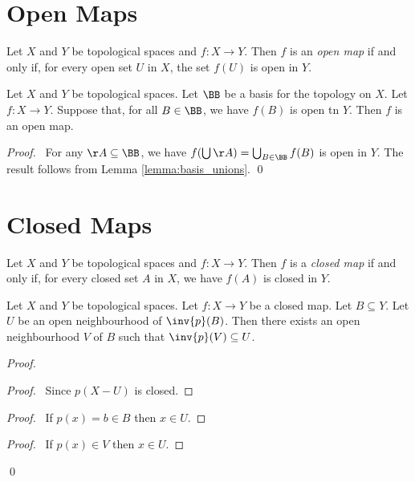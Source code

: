 \section{Open Maps}

\begin{definition}
    Let $X$ and $Y$ be topological spaces and $f : X \rightarrow Y$. Then $f$ is an \emph{open map} if and
    only if, for every open set $U$ in $X$, the set $f(U)$ is open in $Y$.
\end{definition}

\begin{proposition}
    \label{proposition:open_map_basis}
    Let $X$ and $Y$ be topological spaces. Let $\BB$ be a basis for the topology on $X$.
    Let $f : X \rightarrow Y$. Suppose that, for all $B \in \BB$, we have $f(B)$
    is open tn $Y$. Then $f$ is an open map.
\end{proposition}

\begin{proof}
    \pf\ For any $\AA \subseteq \BB$, we have $f(\bigcup \AA) = \bigcup_{B \in \BB} f(B)$
    is open in $Y$. The result follows from Lemma \ref{lemma:basis_unions}. \qed
\end{proof}

\section{Closed Maps}

\begin{definition}
    Let $X$ and $Y$ be topological spaces and $f : X \rightarrow Y$.
    Then $f$ is a \emph{closed map} if and only if, for every closed set
    $A$ in $X$, we have $f(A)$ is closed in $Y$.
\end{definition}

\begin{lemma}
    \label{lemma:closed_map_neighbourhoods}
    Let $X$ and $Y$ be topological spaces. Let $f : X \rightarrow Y$
    be a closed map. Let $B \subseteq Y$. Let $U$ be an open
    neighbourhood of $\inv{p}(B)$. Then there exists an open neighbourhood
    $V$ of $B$ such that $\inv{p}(V) \subseteq U$.
\end{lemma}

\begin{proof}
    \pf
    \begin{proof}
        \pf\ Since $p(X - U)$ is closed.
    \end{proof}
    \begin{proof}
        \pf\ If $p(x) = b \in B$ then $x \in U$.
    \end{proof}
    \begin{proof}
        \pf\ If $p(x) \in V$ then $x \in U$.
    \end{proof}
    \qed
\end{proof}

